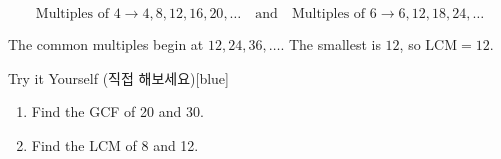 \documentclass[12pt]{book}
\begin{document}
  \[
  \text{Multiples of } 4 \rightarrow 4,8,12,16,20,\ldots \quad\text{and}\quad
  \text{Multiples of } 6 \rightarrow 6,12,18,24,\ldots
  \]

  The common multiples begin at $12,24,36,\ldots$.  
  The smallest is $12$, so $\mathrm{LCM}=12$.

  \begin{flexbox}{Try it Yourself (직접 해보세요)}[blue]
  \begin{enumerate}
    \item Find the GCF of 20 and 30. \vspace*{20pt}
    \item Find the LCM of 8 and 12. \vspace*{20pt}
  \end{enumerate}
  \end{flexbox}








\end{document}
